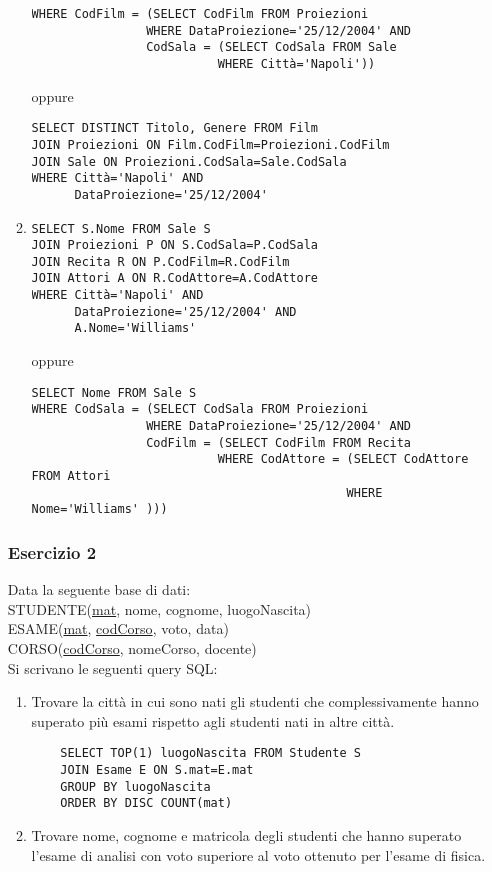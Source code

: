 \documentclass[a4paper]{article}
\begin{document}
\begin{enumerate}
\begin{enumerate}
\begin{verbatim}
WHERE CodFilm = (SELECT CodFilm FROM Proiezioni
                WHERE DataProiezione='25/12/2004' AND
                CodSala = (SELECT CodSala FROM Sale
                          WHERE Città='Napoli'))
\end{verbatim}
oppure
\begin{verbatim}
SELECT DISTINCT Titolo, Genere FROM Film
JOIN Proiezioni ON Film.CodFilm=Proiezioni.CodFilm
JOIN Sale ON Proiezioni.CodSala=Sale.CodSala
WHERE Città='Napoli' AND
      DataProiezione='25/12/2004'
\end{verbatim}
\item
\begin{verbatim}
SELECT S.Nome FROM Sale S
JOIN Proiezioni P ON S.CodSala=P.CodSala
JOIN Recita R ON P.CodFilm=R.CodFilm
JOIN Attori A ON R.CodAttore=A.CodAttore
WHERE Città='Napoli' AND
      DataProiezione='25/12/2004' AND
      A.Nome='Williams'
\end{verbatim}
oppure
\begin{verbatim}
SELECT Nome FROM Sale S
WHERE CodSala = (SELECT CodSala FROM Proiezioni
                WHERE DataProiezione='25/12/2004' AND
                CodFilm = (SELECT CodFilm FROM Recita
                          WHERE CodAttore = (SELECT CodAttore FROM Attori
                                            WHERE Nome='Williams' )))
\end{verbatim}
\end{enumerate}\par \subsubsection{Esercizio 2}
Data la seguente base di dati:\medskip\\
STUDENTE(\underline{mat}, nome, cognome, luogoNascita)\\
ESAME(\underline{mat}, \underline{codCorso}, voto, data)\\
CORSO(\underline{codCorso}, nomeCorso, docente)\medskip\\
Si scrivano le seguenti query SQL:
\begin{enumerate}
  \item Trovare la città in cui sono nati gli studenti che complessivamente hanno superato più esami rispetto agli studenti nati in altre città.
  \begin{verbatim}
    SELECT TOP(1) luogoNascita FROM Studente S
    JOIN Esame E ON S.mat=E.mat
    GROUP BY luogoNascita
    ORDER BY DISC COUNT(mat)
  \end{verbatim}
  \item Trovare nome, cognome e matricola degli studenti che hanno superato l'esame di analisi con voto superiore al voto ottenuto per l'esame di fisica.

\end{enumerate}
\end{enumerate}
\end{document}
